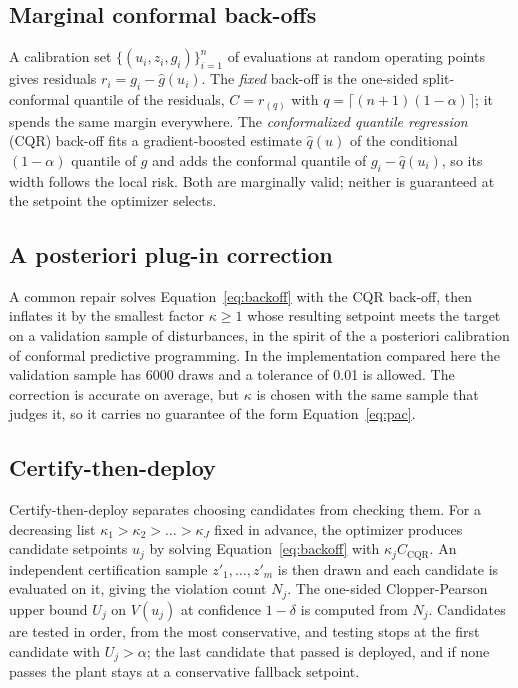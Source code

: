 \documentclass[12pt]{article}
\begin{document}
\subsection{Marginal conformal back-offs}
A calibration set $\{(u_i,z_i,g_i)\}_{i=1}^n$ of evaluations at random operating points gives
residuals $r_i = g_i - \hat g(u_i)$. The \emph{fixed} back-off is the one-sided split-conformal
quantile of the residuals, $C = r_{(q)}$ with $q = \lceil (n+1)(1-\alpha) \rceil$\citep{vovk2005,lei2018}; it spends the same margin everywhere. The \emph{conformalized quantile
regression} (CQR) back-off fits a gradient-boosted estimate $\hat q(u)$ of the conditional
$(1-\alpha)$ quantile of $g$ and adds the conformal quantile of $g_i - \hat q(u_i)$,\citep{romano2019} so its width follows the local risk. Both are marginally valid; neither is
guaranteed at the setpoint the optimizer selects.

\subsection{A posteriori plug-in correction}
A common repair solves Equation~\eqref{eq:backoff} with the CQR back-off, then inflates it by the smallest
factor $\kappa \ge 1$ whose resulting setpoint meets the target on a validation sample of
disturbances, in the spirit of the a posteriori calibration of conformal predictive programming.\citep{zhao2024cpp} In the implementation compared here the validation sample has 6000 draws and a
tolerance of 0.01 is allowed. The correction is accurate on average, but $\kappa$ is chosen with the
same sample that judges it, so it carries no guarantee of the form Equation~\eqref{eq:pac}.

\subsection{Certify-then-deploy}
Certify-then-deploy separates choosing candidates from checking them. For a decreasing list
$\kappa_1 > \kappa_2 > \dots > \kappa_J$ fixed in advance, the optimizer produces candidate
setpoints $u_j$ by solving Equation~\eqref{eq:backoff} with $\kappa_j C_{\mathrm{CQR}}$. An independent
certification sample $z'_1,\dots,z'_m$ is then drawn and each candidate is evaluated on it, giving
the violation count $N_j$. The one-sided Clopper-Pearson upper bound $U_j$ on $V(u_j)$ at
confidence $1-\delta$ is computed from $N_j$.\citep{clopper1934} Candidates are tested in order,
from the most conservative, and testing stops at the first candidate with $U_j > \alpha$; the last
candidate that passed is deployed, and if none passes the plant stays at a conservative fallback
setpoint.
\end{document}
